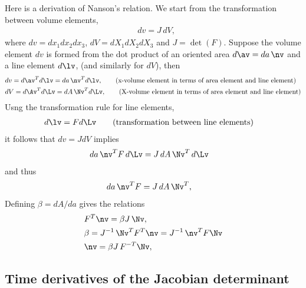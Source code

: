 \documentclass[11pt]{article}
\begin{document}
Here is a derivation of Nanson's relation. 
We start from the transformation between volume elements, 
\begin{align*}
  &   dv = J\, dV , 
\end{align*}
where $dv= d x_1 d x_2 d x_3$, $dV=d X_1 d X_2 d X_3$ and $J=\det(F)$.
Suppose the volume element $dv$ is formed from the dot product of an oriented area $d\av= da\,\nv$ and
a line element $d\lv$, (and similarly for $dV$), then
\begin{align*}
  & dv = d\av^T d\lv = da\,\nv^T d\lv, \qquad \text{(x-volume element in terms of area element and line element)}  \\
  & dV = d\Av^T d\Lv = dA\, \Nv^T d\Lv,\qquad \text{(X-volume element in terms of area element and line element)}  
\end{align*}
Usng the transformation rule for line elements, 
\begin{align*}
  & d\lv = F d\Lv  \qquad\text{(transformation between line elements)}
\end{align*}
it follows that $dv = J dV $ implies
\begin{align*}
  & da\,\nv^T F \,d\Lv = J\, dA\, \Nv^T \,d\Lv
\end{align*}
and thus
\begin{align*}
  & da\,\nv^T F = J\, dA\, \Nv^T , 
\end{align*}
Defining $\beta=dA/da$ gives the relations
\begin{align*}
  & F^T \nv = \beta J\, \Nv , \\
  & \beta = J^{-1}\,  \Nv^T F^T \nv = J^{-1}\, \nv^T F \Nv \\
  & \nv = \beta J\, F^{-T} \Nv ,
\end{align*}

\subsection{Time derivatives of the Jacobian determinant}
\end{document}
